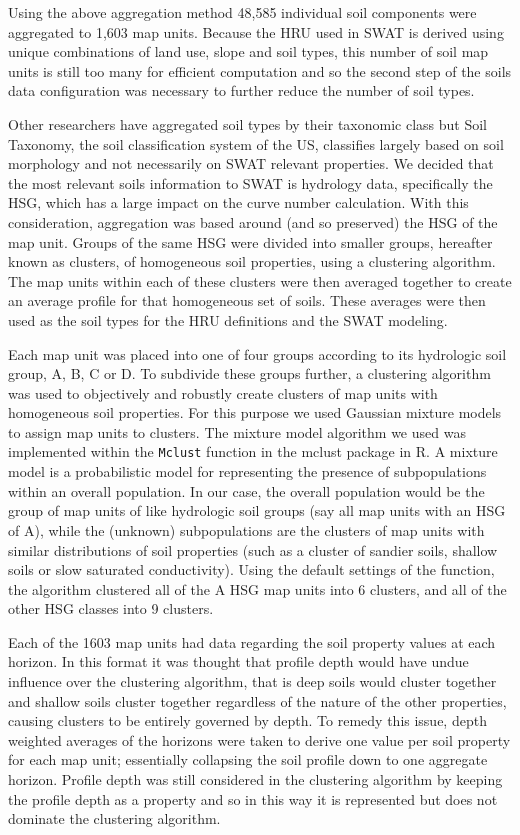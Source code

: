 Using the above aggregation method 48,585 individual soil components were
aggregated to 1,603 map units. Because the HRU used in
SWAT is derived using unique combinations of land use, slope and soil types,
this number of soil map units is still too many for efficient computation  and so
the second step of the soils data configuration was necessary to further reduce
the number of soil types. %

Other researchers have aggregated soil types by their taxonomic class
\citep{gatzke_aggregation_2011} but Soil Taxonomy, the soil classification
system of the US, classifies largely based on soil morphology and not
necessarily on SWAT relevant properties. We decided that the most relevant soils
information to SWAT is hydrology data, specifically the HSG, which has a large impact on the curve number calculation. With this
consideration, aggregation was based around (and so preserved) the HSG of the
map unit. Groups of the same HSG were divided into smaller groups, hereafter
known as clusters, of homogeneous soil properties, using a clustering algorithm.
The map units within each of these clusters were then averaged together to create
an average profile for that homogeneous set of soils. These averages were then
used as the soil types for the HRU definitions and the SWAT modeling.

Each map unit was placed into one of four groups according to its hydrologic soil
group, A, B, C or D. To subdivide these groups further, a clustering algorithm
was used to objectively and robustly create clusters of map units with
homogeneous soil properties. For this purpose we used Gaussian mixture models to
assign map units to clusters. The mixture model algorithm we used was implemented within the
\texttt{Mclust} function in the mclust package \citep{fraley_mclust_2012} in R.
A mixture model is a probabilistic model for representing the presence of
subpopulations within an overall population. In our case, the overall population
would be the group of map units of like hydrologic soil groups (say all map units
with an HSG of A), while the (unknown) subpopulations are the clusters of
map units with similar distributions of soil properties (such as a cluster of
sandier soils, shallow soils or slow saturated conductivity). Using the default
settings of the function, the algorithm clustered all of the A HSG map units into
6 clusters, and all of the other HSG classes into 9 clusters.

Each of the 1603 map units had data regarding the soil property values at each
horizon. In this format it was thought that profile depth would have undue influence over the clustering algorithm, that is deep soils would cluster together and shallow soils cluster together regardless of the nature of the other properties, causing clusters to be entirely governed by
depth. To remedy this issue, depth weighted averages of the horizons were taken
to derive one value per soil property for each map unit; essentially collapsing
the soil profile down to one aggregate horizon. Profile depth was still
considered in the clustering algorithm by keeping the profile depth as a
property and so in this way it is represented but does not dominate the clustering
algorithm.

